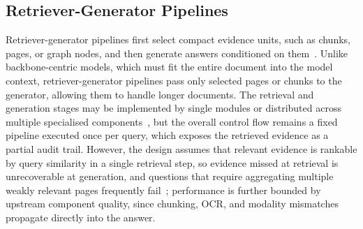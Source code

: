 \documentclass[11pt]{article}
\begin{document}
\subsection{Retriever-Generator Pipelines}
\label{sec:arch-rg}
Retriever-generator pipelines first select compact evidence units, such as chunks, pages, or graph nodes, and then generate answers conditioned on them~\cite{cho2024m3docrag,tanaka2025vdocrag}. Unlike backbone-centric models, which must fit the entire document into the model context, retriever-generator pipelines pass only selected pages or chunks to the generator, allowing them to handle longer documents. The retrieval and generation stages may be implemented by single modules or distributed across multiple specialised components~\cite{wang2024knowledge,duan2025m2rag,han2025mdocagent}, but the overall control flow remains a fixed pipeline executed once per query, which exposes the retrieved evidence as a partial audit trail. However, the design assumes that relevant evidence is rankable by query similarity in a single retrieval step, so evidence missed at retrieval is unrecoverable at generation, and questions that require aggregating multiple weakly relevant pages frequently fail~\cite{wu2025molorag}; performance is further bounded by upstream component quality, since chunking, OCR, and modality mismatches propagate directly into the answer.

\end{document}
